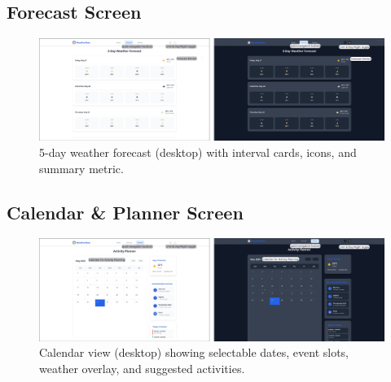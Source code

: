 \documentclass[11pt,a4paper]{article}
\begin{document}
\subsection{Forecast Screen}
\FloatBarrier
\begin{figure}[H]
  \centering
    \includegraphics[width=\linewidth]{desktop_forecast_descripted.jpg}
  \caption{5-day weather forecast (desktop) with interval cards, icons, and summary metric.}
  \label{fig:forecast_desktop}
\end{figure}
\FloatBarrier


\subsection{Calendar \& Planner Screen}
\FloatBarrier
\begin{figure}[H]
  \centering
  \includegraphics[width=\linewidth]{desktop_planner_descripted.jpg}
  \caption{Calendar view (desktop) showing selectable dates, event slots, weather overlay, and suggested activities.}
  \label{fig:calendar_desktop}
\end{figure}
\FloatBarrier
\end{document}
